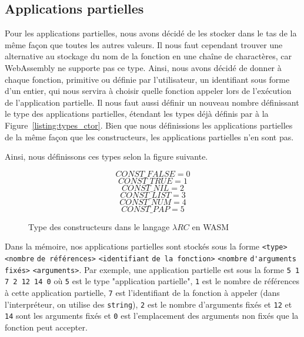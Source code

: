 \documentclass{rapportECL}
\begin{document}
\subsection{Applications partielles}

Pour les applications partielles, nous avons décidé de les stocker dans le tas de la même façon que toutes les autres valeurs.
Il nous faut cependant trouver une alternative au stockage du nom de la fonction en une chaîne de charactères, car WebAssembly
ne supporte pas ce type. Ainsi, nous avons décidé de donner à chaque fonction, primitive ou définie par l'utilisateur, un identifiant
sous forme d'un entier, qui nous servira à choisir quelle fonction appeler lors de l'exécution de l'application partielle.
Il nous faut aussi définir un nouveau nombre définissant le type des applications partielles, étendant les types déjà définis
par à la Figure~\ref{listing:types_ctor}. Bien que nous définissions les applications partielles de la même façon que les constructeurs,
les applications partielles n'en sont pas. 

\medskip

Ainsi, nous définissons ces types selon la figure suivante.


\begin{figure}[H]
	\begin{equation*}
	CONST\_FALSE = 0
	\end{equation*}
	\begin{equation*}
	CONST\_TRUE = 1
	\end{equation*}
	\begin{equation*}
	CONST\_NIL = 2
	\end{equation*}
	\begin{equation*}
	CONST\_LIST = 3
	\end{equation*}
	\begin{equation*}
	CONST\_NUM = 4
	\end{equation*}
	\begin{equation*}
	CONST\_PAP = 5
	\end{equation*}
	\caption{Type des constructeurs dans le langage $\lambda{RC}$ en WASM}
	\label{listing:types_ctor_wasm}
	\end{figure}
	\FloatBarrier 

\medskip

Dans la mémoire, nos applications partielles sont stockés sous la forme 
\verb|<type>| \verb|<nombre| \verb|de références>| \verb|<identifiant| \verb|de la fonction>| \verb|<nombre| \verb|d'arguments| \verb|fixés>| \verb|<arguments>|. 
Par exemple, une application partielle est sous la forme \verb|5 1 7 2 12 14 0| où \verb|5| est le type "application partielle", 
\verb|1| est le nombre de références à cette application partielle, 
\verb|7| est l'identifiant de la fonction à appeler (dans l'interpréteur, on utilise des \verb|string|), 
\verb|2| est le nombre d'arguments fixés et \verb|12| et \verb|14| sont les arguments fixés et
\verb|0| est l'emplacement des arguments non fixés que la fonction peut accepter.
\end{document}
